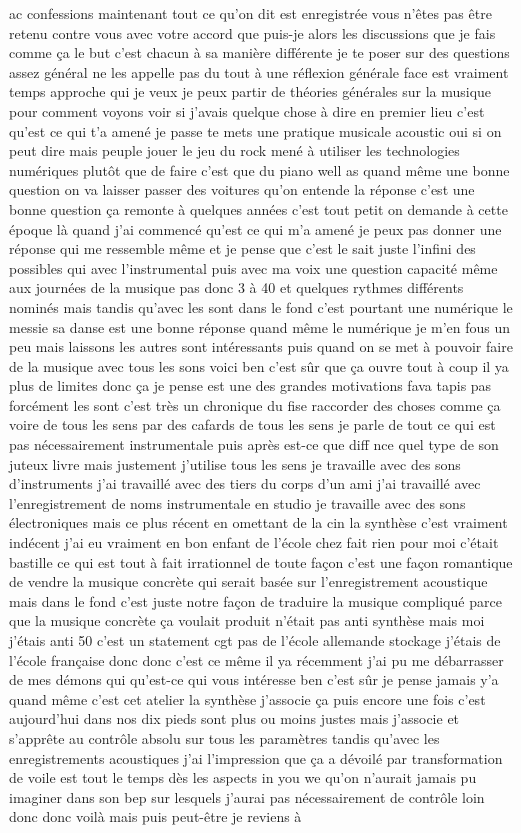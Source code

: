 ac confessions maintenant tout ce qu'on dit est enregistrée vous n'êtes pas être retenu contre vous avec votre accord que puis-je alors les discussions que je fais comme ça le but c'est chacun à sa manière différente je te poser sur des questions assez général ne les appelle pas du tout à une réflexion générale face est vraiment temps approche qui je veux je peux partir de théories générales sur la musique pour comment voyons voir si j'avais quelque chose à dire en premier lieu c'est qu'est ce qui t'a amené je passe te mets une pratique musicale acoustic oui si on peut dire mais peuple jouer le jeu du rock mené à utiliser les technologies numériques plutôt que de faire c'est que du piano well as quand même une bonne question on va laisser passer des voitures qu'on entende la réponse c'est une bonne question ça remonte à quelques années c'est tout petit on demande à cette époque là quand j'ai commencé qu'est ce qui m'a amené je peux pas donner une réponse qui me ressemble même et je pense que c'est le sait juste l'infini des possibles qui avec l'instrumental puis avec ma voix une question capacité même aux journées de la musique pas donc 3 à 40 et quelques rythmes différents nominés mais tandis qu'avec les sont dans le fond c'est pourtant une numérique le messie sa danse est une bonne réponse quand même le numérique je m'en fous un peu mais laissons les autres sont intéressants puis quand on se met à pouvoir faire de la musique avec tous les sons voici ben c'est sûr que ça ouvre tout à coup il ya plus de limites donc ça je pense est une des grandes motivations fava tapis pas forcément les sont c'est très un chronique du fise raccorder des choses comme ça voire de tous les sens par des cafards de tous les sens je parle de tout ce qui est pas nécessairement instrumentale puis après est-ce que diff nce quel type de son juteux livre mais justement j'utilise tous les sens je travaille avec des sons d'instruments j'ai travaillé avec des tiers du corps d'un ami j'ai travaillé avec l'enregistrement de noms instrumentale en studio je travaille avec des sons électroniques mais ce plus récent en omettant de la cin la synthèse c'est vraiment indécent j'ai eu vraiment en bon enfant de l'école chez fait rien pour moi c'était bastille ce qui est tout à fait irrationnel de toute façon c'est une façon romantique de vendre la musique concrète qui serait basée sur l'enregistrement acoustique mais dans le fond c'est juste notre façon de traduire la musique compliqué parce que la musique concrète ça voulait produit n'était pas anti synthèse mais moi j'étais anti 50 c'est un statement cgt pas de l'école allemande stockage j'étais de l'école française donc donc c'est ce même il ya récemment j'ai pu me débarrasser de mes démons qui qu'est-ce qui vous intéresse ben c'est sûr je pense jamais y'a quand même c'est cet atelier la synthèse j'associe ça puis encore une fois c'est aujourd'hui dans nos dix pieds sont plus ou moins justes mais j'associe et s'apprête au contrôle absolu sur tous les paramètres tandis qu'avec les enregistrements acoustiques j'ai l'impression que ça a dévoilé par transformation de voile est tout le temps dès les aspects in you we qu'on n'aurait jamais pu imaginer dans son bep sur lesquels j'aurai pas nécessairement de contrôle loin donc donc voilà mais puis peut-être je reviens à 